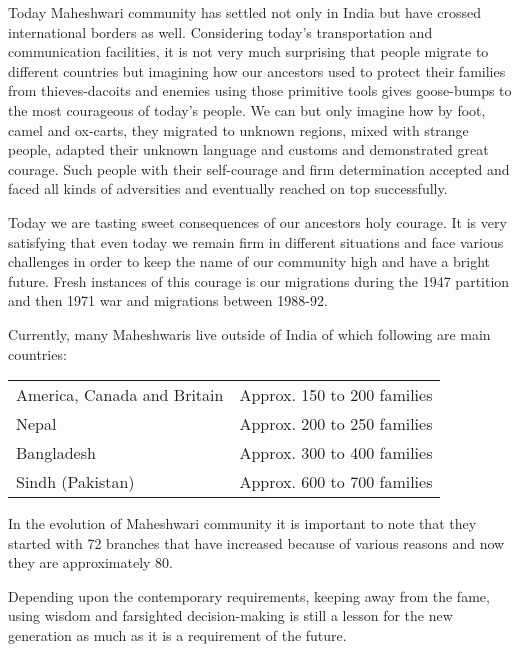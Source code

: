 Today Maheshwari community has settled not only in India but have crossed international borders as well. Considering today's transportation and communication facilities, it is not very much surprising that people migrate to different countries but imagining how our ancestors used to protect their families from thieves-dacoits and enemies using those primitive tools gives goose-bumps to the most courageous of today's people. We can but only imagine how by foot, camel and ox-carts, they migrated to unknown regions, mixed with strange people, adapted their unknown language and customs and demonstrated great courage. Such people with their self-courage and firm determination accepted and faced all kinds of adversities and eventually reached on top successfully.

Today we are tasting sweet consequences of our ancestors holy courage. It is very satisfying that even today we remain firm in different situations and face various challenges in order to keep the name of our community high and have a bright future. Fresh instances of this courage is our migrations during the 1947 partition and then 1971 war and migrations between 1988-92.

Currently, many Maheshwaris live outside of India of which following are main countries:
\begin{center}
\begin{tabular}{ll}
America, Canada and Britain & Approx. 150 to 200 families \\ 
Nepal & Approx. 200 to 250 families \\ 
Bangladesh & Approx. 300 to 400 families \\ 
Sindh (Pakistan) & Approx. 600 to 700 families
\end{tabular}
\end{center}

In the evolution of Maheshwari community it is important to note that they started with 72 branches that have increased because of various reasons and now they are approximately 80.

Depending upon the contemporary requirements, keeping away from the fame, using wisdom and farsighted decision-making is still a lesson for the new generation as much as it is a requirement of the future.
